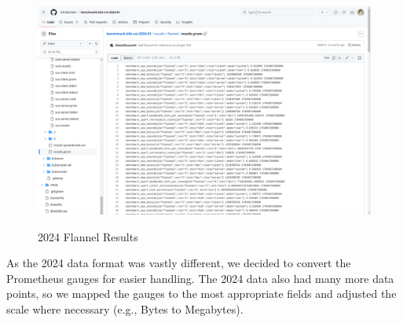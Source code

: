 \begin{figure}[H]
\centering
\caption {2024 Flannel Results}
\includegraphics[width=\linewidth]{images/flannel-prom.png}
\label{fig:flannel-prom}
\end{figure}

As the 2024 data format was vastly different, we decided to convert the Prometheus gauges for easier handling. The 2024 data also had many more data points, so we mapped the gauges to the most appropriate fields and adjusted the scale where necessary (e.g., Bytes to Megabytes).

